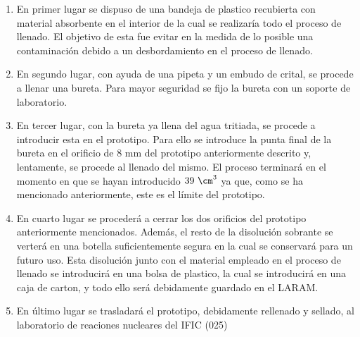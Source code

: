 \begin{enumerate}
\item{} En primer lugar se dispuso de una bandeja de plastico recubierta con material absorbente en el interior de la cual se realizaría todo el proceso de llenado. El objetivo de esta fue evitar en la medida de lo posible una contaminación debido a un desbordamiento en el proceso de llenado. 

\item{} En segundo lugar, con ayuda de una pipeta y un embudo de crital, se procede a llenar una bureta. Para mayor seguridad se fijo la bureta con un soporte de laboratorio. 

\item{} En tercer lugar, con la bureta ya llena del agua tritiada, se procede a introducir esta en el prototipo. Para ello se introduce la punta final de la bureta en el orificio de 8 mm del prototipo anteriormente descrito y, lentamente, se procede al llenado del mismo. El proceso terminará en el momento en que se hayan introducido $39~\cm^3$ ya que, como se ha mencionado anteriormente, este es el límite del prototipo.

\item{} En cuarto lugar se procederá a cerrar los dos orificios del prototipo anteriormente mencionados. Además, el resto de la disolución sobrante se verterá en una botella suficientemente segura en la cual se conservará para un futuro uso. Esta disolución junto con el material empleado en el proceso de llenado se introducirá en una bolsa de plastico, la cual se introducirá en una caja de carton, y todo ello será debidamente guardado en el LARAM.

\item{} En último lugar se trasladará el prototipo, debidamente rellenado y sellado, al laboratorio de reaciones nucleares del IFIC (025)

\end{enumerate}

